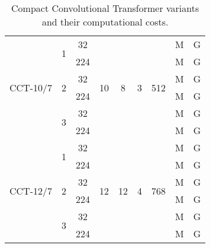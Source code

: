 \documentclass[10pt,twocolumn,letterpaper]{article}
\begin{document}
\begin{table*}[t]
\begin{tabular}{c|c|c|cccc|rr}
        \midrule
        \multirow{6}{*}{CCT-10/7} & \multirow{2}{*}{1} & 32 & \multirow{6}{*}{10} & \multirow{6}{*}{8} & \multirow{6}{*}{3} & \multirow{6}{*}{512} &  M &  G \\
        && 224 &&&&&  M &  G \\
        \cline{2-3}\cline{8-9}
        & \multirow{2}{*}{2} & 32 &&&&&  M &  G \\
        && 224 &&&&&  M &  G \\
        \cline{2-3}\cline{8-9}
        & \multirow{2}{*}{3} & 32 &&&&&  M &  G \\
        && 224 &&&&&  M &  G \\
        \midrule
        \multirow{6}{*}{CCT-12/7} & \multirow{2}{*}{1} & 32 & \multirow{6}{*}{12} & \multirow{6}{*}{12} & \multirow{6}{*}{4} & \multirow{6}{*}{768} &  M &  G \\
        && 224 &&&&&  M &  G \\
        \cline{2-3}\cline{8-9}
        & \multirow{2}{*}{2} & 32 &&&&&  M &  G \\
        && 224 &&&&&  M &  G \\
        \cline{2-3}\cline{8-9}
        & \multirow{2}{*}{3} & 32 &&&&&  M &  G \\
        && 224 &&&&&  M &  G \\
        \bottomrule
    \end{tabular}
    \caption{Compact Convolutional Transformer variants and their computational costs.}
    \label{tab:model_sizes}
\end{table*}
 
\end{document}
